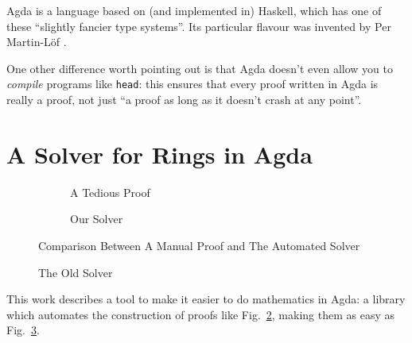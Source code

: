 \documentclass[acmsmall, screen, nonacm, timestamp, review]{acmart}
\theoremstyle{definition}
\theoremstyle{definition}
\begin{document}
Agda is a language based on (and implemented in) Haskell, which has one of these
``slightly fancier type systems''. Its particular flavour was invented by Per
Martin-Löf \cite{martin-lof_intuitionistic_1980}.

One other difference worth pointing out is that Agda doesn't even allow you to
\emph{compile} programs like \verb+head+: this ensures that every proof written
in Agda is really a proof, not just ``a proof as long as it doesn't crash at any
point''\footnotemark.

\pagebreak
\section{A Solver for Rings in Agda}
\begin{figure}
  \centering
  \begin{subfigure}[b]{\textwidth}
    \centering
    \label{ring-lemma}
  \end{subfigure}
  \begin{subfigure}[b]{.5\textwidth}
    \caption{A Tedious Proof}
    \label{ring-proof}
  \end{subfigure}%
  \begin{subfigure}[b]{.3\textwidth}
    \centering
    \caption{Our Solver}
    \label{the-solver}
  \end{subfigure}
  \caption{Comparison Between A Manual Proof and The Automated Solver}
  \label{comparison}
\end{figure}

\begin{figure}[b]
  \caption{The Old Solver}
  \label{old-solver}
\end{figure}

This work describes a tool to make it easier to do mathematics in Agda:
a library which automates the construction of proofs like
Fig.~\ref{ring-proof}, making them as easy as Fig.~\ref{the-solver}.
\end{document}
